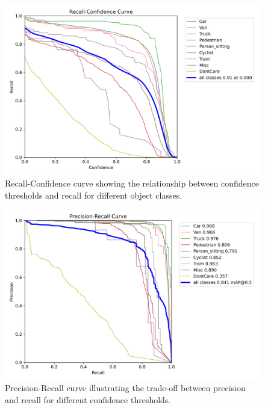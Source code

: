 \documentclass[12pt]{article}
\begin{document}
\begin{figure}[h]
    \centering
    \includegraphics[width=\textwidth]{images/R_curve.png}
    \caption{Recall-Confidence curve showing the relationship between confidence thresholds and recall for different object classes.}
    \label{fig:recall_confidence_curve}
\end{figure}

\begin{figure}[h]
    \centering
    \includegraphics[width=\textwidth]{images/PR_curve.png}
    \caption{Precision-Recall curve illustrating the trade-off between precision and recall for different confidence thresholds.}
    \label{fig:precision_recall_curve}
\end{figure}
\end{document}
